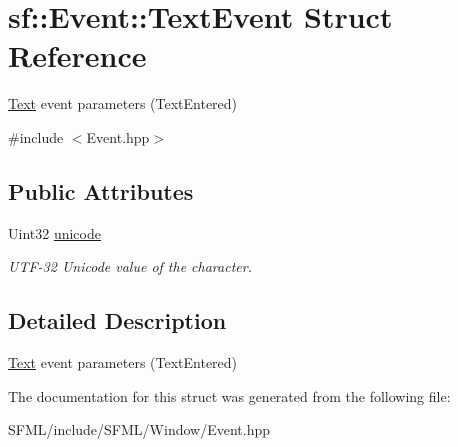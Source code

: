 \hypertarget{structsf_1_1_event_1_1_text_event}{}\section{sf\+:\+:Event\+:\+:Text\+Event Struct Reference}
\label{structsf_1_1_event_1_1_text_event}


\mbox{\hyperlink{classsf_1_1_text}{Text}} event parameters (Text\+Entered)  




{\ttfamily \#include $<$Event.\+hpp$>$}

\subsection*{Public Attributes}
\begin{DoxyCompactItemize}
\item 
\mbox{\label{structsf_1_1_event_1_1_text_event_a00d96b1a5328a1d7cbc276e161befcb0}} 
Uint32 \mbox{\hyperlink{structsf_1_1_event_1_1_text_event_a00d96b1a5328a1d7cbc276e161befcb0}{unicode}}
\begin{DoxyCompactList}\small\item\em U\+T\+F-\/32 Unicode value of the character. \end{DoxyCompactList}\end{DoxyCompactItemize}


\subsection{Detailed Description}
\mbox{\hyperlink{classsf_1_1_text}{Text}} event parameters (Text\+Entered) 

\begin{DoxyVerb}\end{DoxyVerb}
 

The documentation for this struct was generated from the following file\+:\begin{DoxyCompactItemize}
\item 
S\+F\+M\+L/include/\+S\+F\+M\+L/\+Window/Event.\+hpp\end{DoxyCompactItemize}

